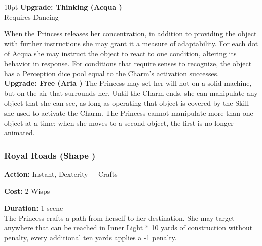 \begin{myindentpar}{10pt}
\textbf{Upgrade: Thinking (Acqua \textbullet\textbullet)}\\

Requires Dancing

When the Princess releases her concentration, in addition to providing the object with further instructions she may grant it a measure of adaptability. For each dot of Acqua she may instruct the object to react to one condition, altering its behavior in response. For conditions that require senses to recognize, the object has a Perception dice pool equal to the Charm’s activation successes.\\

\textbf{Upgrade: Free (Aria \textbullet\textbullet)}
The Princess may set her will not on a solid machine, but on the air that surrounds her. Until the Charm ends, she can manipulate any object that she can see, as long as operating that object is covered by the Skill she used to activate the Charm. The Princess cannot manipulate more than one object at a time; when she moves to a second object, the first is no longer
animated.

\end{myindentpar}

\subsubsection*{Royal Roads (Shape \textbullet\textbullet)}
\noindent \textbf{Action:} Instant, Dexterity + Crafts

\noindent \textbf{Cost:} 2 Wisps

\noindent \textbf{Duration:} 1 scene\\

The Princess crafts a path from herself to her destination. She may target anywhere that can be reached in Inner Light * 10 yards of construction without penalty, every additional ten yards applies a -1 penalty.

